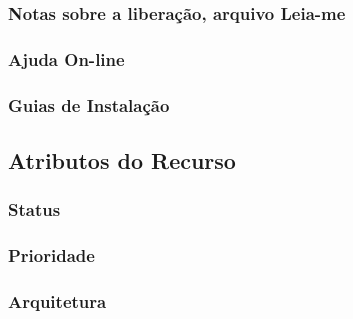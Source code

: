 \subsubsection{	Notas sobre a liberação, arquivo Leia-me}

\subsubsection{Ajuda On-line}

\subsubsection{Guias de Instalação}

\subsection{Atributos do Recurso}

\subsubsection{Status}

\subsubsection{Prioridade}

\subsubsection{Arquitetura}